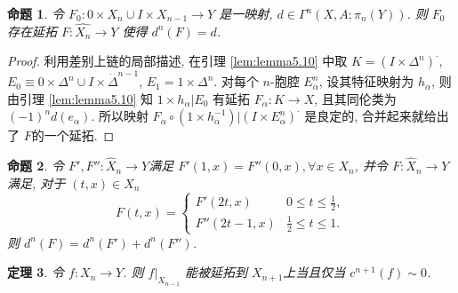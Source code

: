 \documentclass{ctexart}
\theoremstyle{plain}
\newtheorem{theorem}{定理}[section]
\newtheorem{proposition}[theorem]{命题}
\theoremstyle{definition}
\begin{document}
            \begin{proposition}
                \label{prop:5.12}
                令 $F_0:0\times X_{n}\cup I\times X_{n-1}\to Y$ 是一映射, $d \in \Gamma^{n}(X,A;\pi_{n}(Y))$. 则 $F_0$ 存在延拓 $F:\hat{X_{n}}\to Y$ 使得 $d^{n}(F)=d$.
            \end{proposition}

            \begin{proof}
                利用差别上链的局部描述, 在引理 \ref{lem:lemma5.10} 中取 $K=(I\times \Delta^{n})^{\cdot}$, $E_{0}\equiv 0\times \Delta^{n}\cup I\times \dot{\Delta}^{n-1}$, $E_1=1\times \Delta^{n}$. 对每个 $n$-胞腔 $E_{\alpha}^{n}$, 设其特征映射为 $h_{\alpha}$, 则由引理 \ref{lem:lemma5.10} 知 $1\times h_{\alpha}|E_0$ 有延拓 $F_{\alpha}:K\to X$, 且其同伦类为 $(-1)^{n}d(e_{\alpha})$. 所以映射 $F_{\alpha}\circ(1\times h_{\alpha}^{-1})|(I\times E_{\alpha}^{n})^{\cdot}$ 是良定的, 合并起来就给出了 $F$的一个延拓.
            \end{proof}

            \begin{proposition}
                \label{prop:5.13}
                令 $F',F'':\hat{X}_{n}\to Y$满足 $F'(1,x)=F''(0,x), \forall x\in X_{n}$, 并令 $F:\hat{X}_{n}\to Y$ 满足, 对于 $(t,x)\in \hat{X}_{n}$
                \begin{equation*}
                  F(t,x)=\begin{cases} F'(2t,x) & 0\le t\le \frac{1}{2}, \\ F''(2t-1,x) & \frac{1}{2}\le t\le 1. \end{cases}
                \end{equation*}
                则 $d^{n}(F)=d^{n}(F')+d^{n}(F'')$.
            \end{proposition}

            \begin{theorem}
                \label{thm:obstruction cohomologous to zero}
                令 $f:X_{n}\to Y$. 则 $f|_{X_{n-1}}$ 能被延拓到 $X_{n+1}$上当且仅当 $c^{n+1}(f)\sim 0$.
            \end{theorem}
\end{document}
